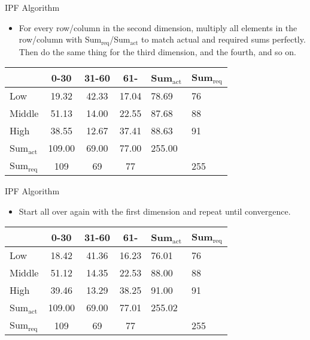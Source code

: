 \documentclass{beamer}
\begin{document}
\begin{frame}{IPF Algorithm}
\begin{itemize}
  \item For every row/column in the second dimension, multiply all elements in the row/column with Sum$_{\mathrm{req}}$/Sum$_{\mathrm{act}}$ to match
actual and required sums perfectly. Then do the same thing for the third dimension, and the fourth, and so on.
\end{itemize}

\begin{table}
\centering
\begin{tabular}{l||c c c||l|l}
 & 0-30 & 31-60 & 61- & Sum$_{\mathrm{act}}$ & Sum$_{\mathrm{req}}$\\
\hline \hline
Low & 19.32 & 42.33 & 17.04 & 78.69 & 76 \\
Middle & 51.13 & 14.00 & 22.55 & 87.68 & 88 \\
High & 38.55 & 12.67 & 37.41 & 88.63 & 91 \\
\hline \hline
Sum$_{\mathrm{act}}$ & 109.00 & 69.00 & 77.00 & 255.00 & \\
\hline
Sum$_{\mathrm{req}}$ & 109 & 69 & 77 & & 255 \\
\end{tabular}
\end{table}
\end{frame}


\begin{frame}{IPF Algorithm}
\begin{itemize}
  \item Start all over again with the first dimension and repeat until convergence.
\end{itemize}

\begin{table}
\centering
\begin{tabular}{l||c c c||l|l}
 & 0-30 & 31-60 & 61- & Sum$_{\mathrm{act}}$ & Sum$_{\mathrm{req}}$\\
\hline \hline
Low & 18.42 & 41.36 & 16.23 & 76.01 & 76 \\
Middle & 51.12 & 14.35 & 22.53 & 88.00 & 88 \\
High & 39.46 & 13.29 & 38.25 & 91.00 & 91 \\
\hline \hline
Sum$_{\mathrm{act}}$ & 109.00 & 69.00 & 77.01 & 255.02 & \\
\hline
Sum$_{\mathrm{req}}$ & 109 & 69 & 77 & & 255 \\
\end{tabular}
\end{table}
\end{frame}
\end{document}

